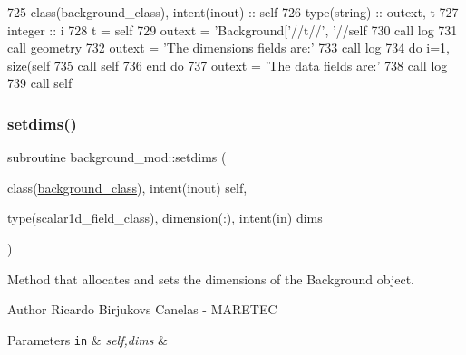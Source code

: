 \begin{DoxyCode}
725     \textcolor{keywordtype}{class}(background\_class), \textcolor{keywordtype}{intent(inout)} :: self
726     \textcolor{keywordtype}{type}(string) :: outext, t
727     \textcolor{keywordtype}{integer} :: i
728     t = self%
729     outext = \textcolor{stringliteral}{'Background['}//t//\textcolor{stringliteral}{', '}//self%
730     \textcolor{keyword}{call }log%
731     \textcolor{keyword}{call }geometry%
732     outext = \textcolor{stringliteral}{'The dimensions fields are:'}
733     \textcolor{keyword}{call }log%
734     \textcolor{keywordflow}{do} i=1, \textcolor{keyword}{size}(self%
735         \textcolor{keyword}{call }self%
736 \textcolor{keywordflow}{    end do}
737     outext = \textcolor{stringliteral}{'The data fields are:'}
738     \textcolor{keyword}{call }log%
739     \textcolor{keyword}{call }self%
\end{DoxyCode}
\mbox{\label{namespacebackground__mod_a06d96d4627391d74feb105a842a87dc0}} 
\subsubsection{\texorpdfstring{setdims()}{setdims()}}
{\footnotesize\ttfamily subroutine background\+\_\+mod\+::setdims (\begin{DoxyParamCaption}\item[{class(\mbox{\hyperlink{structbackground__mod_1_1background__class}{background\+\_\+class}}), intent(inout)}]{self,  }\item[{type(scalar1d\+\_\+field\+\_\+class), dimension(\+:), intent(in)}]{dims }\end{DoxyParamCaption})\hspace{0.3cm}{\ttfamily [private]}}



Method that allocates and sets the dimensions of the Background object. 

\begin{DoxyAuthor}{Author}
Ricardo Birjukovs Canelas -\/ M\+A\+R\+E\+T\+EC 
\end{DoxyAuthor}

\begin{DoxyParams}[1]{Parameters}
\mbox{\tt in}  & {\em self,dims} & \\
\hline
\end{DoxyParams}


